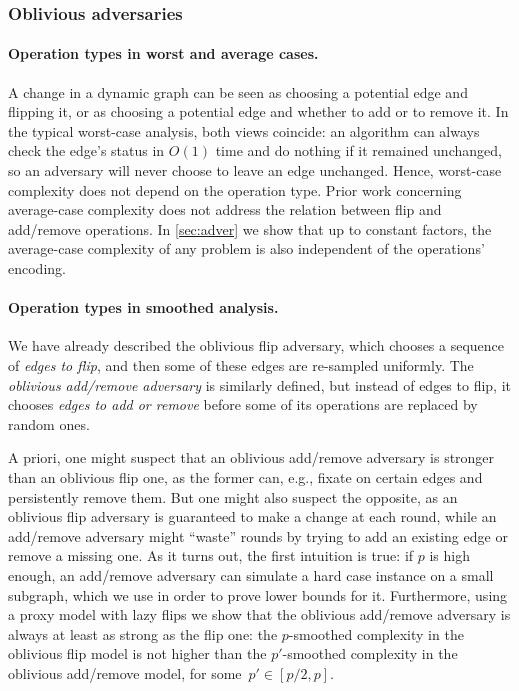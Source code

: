 \documentclass[letter,11pt]{article}
\begin{document}
\subsubsection{Oblivious adversaries}
\paragraph{Operation types in worst and average cases.}
A change in a dynamic graph can be seen
as choosing a potential edge and flipping it, or as choosing a potential edge and whether to add or to remove it.
In the typical worst-case analysis, both views coincide:
an algorithm can always check the edge's status in $O(1)$ time and do nothing if it remained unchanged, so an adversary will never choose to leave an edge unchanged.
Hence, worst-case complexity does not depend on the operation type.
Prior work concerning average-case complexity does not address the relation between flip and add/remove operations.
In \cref{sec:adver} we show that up to constant factors, the average-case complexity of any problem is also independent of the operations' encoding.



\paragraph{Operation types in smoothed analysis.}
We have already described the oblivious flip adversary, which chooses a sequence of \emph{edges to flip}, and then some of these edges are re-sampled uniformly.
The \emph{oblivious add/remove adversary} is similarly defined, but instead of edges to flip, it chooses \emph{edges to add or remove} before some of its operations are replaced by random ones.

A priori, one might suspect that an oblivious add/remove adversary is stronger than an oblivious flip one, as the former can, e.g., fixate on certain edges and persistently remove them.
But one might also suspect the opposite, as an oblivious flip adversary is guaranteed to make a change at each round, 
while an add/remove adversary might ``waste'' rounds by trying to add an existing edge or remove a missing one.
As it turns out, the first intuition is true: if $p$ is high enough, an add/remove adversary can simulate a hard case instance on a small subgraph,
which we use in order to prove lower bounds for it. 
Furthermore, using a proxy model with lazy flips we show that the oblivious add/remove adversary is always at least as strong as the flip one: the $p$-smoothed complexity in the oblivious flip model is not higher than the $p'$-smoothed complexity in the oblivious add/remove model, for some~$p' \in [p/2,p]$.
\end{document}
